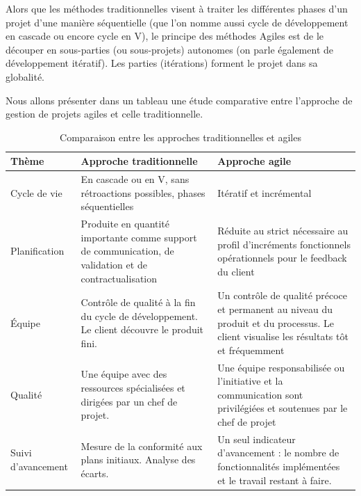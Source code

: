 Alors que les méthodes traditionnelles visent à traiter les différentes phases d’un projet d’une manière séquentielle (que l’on nomme aussi cycle de développement en cascade ou encore cycle
en V), le principe des méthodes Agiles est de le découper en sous-parties (ou sous-projets)
autonomes (on parle également de développement itératif). Les parties (itérations) forment le
projet dans sa globalité.

Nous allons présenter dans un tableau une étude comparative entre l’approche de gestion de projets agiles et celle traditionnelle.


\begin{table}[H]
	\centering
	\caption{Comparaison entre les approches traditionnelles et agiles}
	\label{tab:my-table}
	\begin{tabular}{|l|p{5cm}|p{6cm}|}
		\hline
		\textbf{Thème}      & \textbf{Approche traditionnelle}                                                                       & \textbf{Approche agile}                                                                                                                                              \\ \hline
		Cycle de vie        & En cascade ou en V, sans rétroactions possibles, phases séquentielles                                   & Itératif et incrémental                                                                                                                                              \\ \hline
		Planification       & Produite en quantité importante comme support de communication, de validation et de contractualisation & Réduite au strict nécessaire au profil d’incréments fonctionnels opérationnels pour le feedback du client                                                            \\ \hline
		Équipe              & Contrôle de qualité à la fin du cycle de développement. Le client découvre le produit fini.            & Un contrôle de qualité précoce et permanent au niveau du produit et du processus. Le client visualise les résultats tôt et fréquemment                               \\ \hline
		Qualité             & Une équipe avec des ressources spécialisées et dirigées par un chef de projet.                            & Une équipe responsabilisée ou l’initiative et la communication sont privilégiées et soutenues par le chef de projet                                                       \\ \hline
		Suivi d’avancement  & Mesure de la conformité aux plans initiaux. Analyse des écarts.                                        & Un seul indicateur d’avancement : le nombre de fonctionnalités implémentées et le travail restant à faire.                                                            \\ \hline

\end{tabular}
\end{table}
